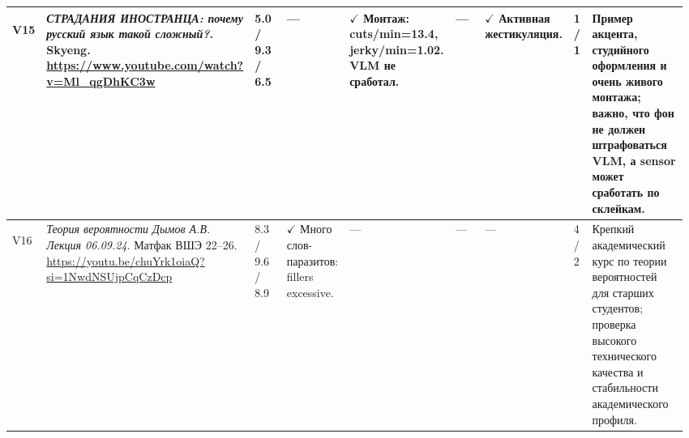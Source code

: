 \begin{landscape}
\begin{longtable}{
L{0.035\linewidth}
L{0.235\linewidth}|
L{0.075\linewidth}|
L{0.085\linewidth}
L{0.160\linewidth}
L{0.070\linewidth}
L{0.085\linewidth}|
L{0.035\linewidth}|
L{0.190\linewidth}
}
\midrule

\hypertarget{vid:v15}{V15} &
\textit{СТРАДАНИЯ ИНОСТРАНЦА: почему русский язык такой сложный?}. Skyeng. {\tiny\url{https://www.youtube.com/watch?v=Ml_qgDhKC3w}} &
5.0 / 9.3 / 6.5 &
--- &
$\checkmark$ Монтаж: cuts/min=13.4, jerky/min=1.02. VLM не сработал. &
--- &
$\checkmark$ Активная жестикуляция.&
1 / 1 &
Пример акцента, студийного оформления и очень живого монтажа; важно, что фон не должен штрафоваться VLM, а sensor может сработать по склейкам. \\

\midrule

\hypertarget{vid:v16}{V16} &
\textit{Теория вероятности Дымов А.В. Лекция 06.09.24}. Матфак ВШЭ 22--26. {\tiny\url{https://youtu.be/chuYrk1oiaQ?si=1NwdNSUjpCqCzDcp}} &
8.3 / 9.6 / 8.9 &
$\checkmark$ Много слов-паразитов: fillers excessive.&
--- &
--- &
--- &
4 / 2 &
Крепкий академический курс по теории вероятностей для старших студентов; проверка высокого технического качества и стабильности академического профиля. \\

\bottomrule
\end{longtable}

\end{landscape}
\endgroup